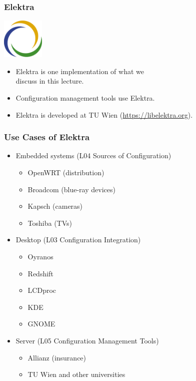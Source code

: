 \begin{frame}
	\frametitle{Elektra}
	\hfill \includegraphics[width=2cm]{../figures/logo}
	\vspace{-1cm}
	\begin{itemize}
		\item Elektra is one implementation of what we \\ discuss in this lecture.
		\item Configuration management tools use Elektra.
		\item Elektra is developed at TU Wien (\url{https://libelektra.org}).
	\end{itemize}
\end{frame}

\begin{frame}
	\frametitle{Use Cases of Elektra}
	\begin{itemize}[<+->]
	\item Embedded systems (L04 Sources of Configuration)
	\begin{itemize}
	\item OpenWRT (distribution)
	\item Broadcom (blue-ray devices)
	\item Kapsch (cameras)
	\item Toshiba (TVs)
	\end{itemize}
	\item Desktop (L03 Configuration Integration)
	\begin{itemize}
	\item Oyranos
	\item Redshift
	\item LCDproc
	\item KDE
	\item GNOME
	\end{itemize}
	\item Server (L05 Configuration Management Tools)
	\begin{itemize}
	\item Allianz (insurance)
	\item TU Wien and other universities
	\end{itemize}
	\end{itemize}
\end{frame}

